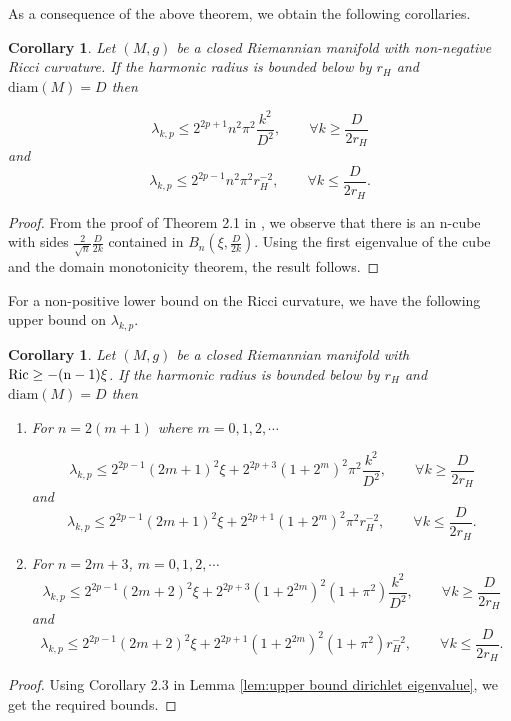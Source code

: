 \documentclass[10 pt, reqno]{amsart}
\newtheorem{corollary}[theorem]{Corollary}
\begin{document}
As a consequence of the above theorem, we obtain the following corollaries.

\begin{corollary}
\label{cor:positive_ricci}
Let $(M,g)$ be a closed Riemannian manifold with non-negative Ricci curvature.  If the harmonic radius is bounded below by $r_H$ and $\mathrm{ diam}(M)= D$ then 

\[\lambda_{k,p}\le 2^{2p+1}n^2\pi^2\frac{k^2}{D^2},\qquad \forall k\ge\frac{D}{2r_H}\]
and \[\lambda_{k,p}\le 2^{2p-1}n^2\pi^2r_H^{-2},\qquad \forall k\le \frac{D}{2r_H}.\]

\end{corollary}

\begin{proof}
    From the proof of Theorem 2.1 in \cite{Cheng}, we observe that there is an n-cube with sides $\frac{2}{\sqrt{n}}\frac{D}{2k}$ contained in $B_n(\xi,\frac{D}{2k})$. Using the first eigenvalue of the cube and the domain monotonicity theorem, the result follows.
\end{proof}
For a non-positive lower bound on the Ricci curvature, we have the following upper bound on $\lambda_{k,p}.$ 
\begin{corollary} Let $(M,g)$ be a closed Riemannian manifold with $\rm{Ric}\geq -(n-1)\xi$.  If the harmonic radius is bounded below by $r_H$ and $\mathrm{diam}(M)= D$ then 
\begin{enumerate}
    \item For $n=2(m+1)$ where $m=0,1,2,\cdots$

\[\lambda_{k,p}\le 2^{2p-1}(2m+1)^2\xi+2^{2p+3}(1+2^m)^2\pi^2\frac{k^2}{D^2},\qquad \forall k\ge\frac{D}{2r_H}\]
and \[\lambda_{k,p}\le 2^{2p-1}(2m+1)^2\xi+2^{2p+1}(1+2^m)^2\pi^2r_H^{-2},\qquad \forall k\le \frac{D}{2r_H}.\]
\item For $n=2m+3$, $m=0,1,2,\cdots$
                    \[\lambda_{k,p}\le 2^{2p-1}(2m+2)^2\xi+2^{2p+3}(1+2^{2m})^2(1+\pi^2)\frac{k^2}{D^2},\qquad \forall k\ge\frac{D}{2r_H}\]
     and \[\lambda_{k,p}\le 2^{2p-1}(2m+2)^2\xi+2^{2p+1}(1+2^{2m})^2(1+\pi^2)r_H^{-2},\qquad \forall k\le \frac{D}{2r_H}.\]       
\end{enumerate}  
\end{corollary}
\begin{proof}
  Using Corollary 2.3 \cite{Cheng} in Lemma \ref{lem:upper bound dirichlet eigenvalue}, we get the required bounds.
\end{proof}
\end{document}
